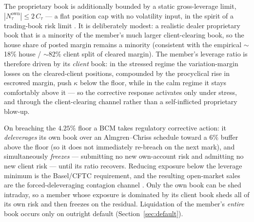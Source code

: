 The proprietary book is additionally bounded by a static gross-leverage limit,
$|N^{\mathrm{own}}_\tau| \le 2\,C_\tau$ --- a flat position cap with no volatility input, in the
spirit of a trading-book risk limit \citep{basel_frtb}. It is deliberately modest: a realistic
dealer proprietary book that is a minority of the member's much larger client-clearing book, so the
house share of posted margin remains a minority (consistent with the empirical $\sim$18\% house /
$\sim$82\% client split of cleared margin). The member's leverage ratio is therefore driven by its
\emph{client} book: in the stressed regime the variation-margin losses on the cleared-client
positions, compounded by the procyclical rise in escrowed margin, push $\kappa$ below the floor,
while in the calm regime it stays comfortably above it --- so the corrective response activates only
under stress, and through the client-clearing channel rather than a self-inflicted proprietary
blow-up.

On breaching the $4.25\%$ floor a BCM takes regulatory corrective action: it \emph{deleverages} its
own book over an Almgren--Chriss schedule \citep{almgren_chriss_2000} toward a $6\%$ buffer above
the floor (so it does not immediately re-breach on the next mark), and simultaneously
\emph{freezes} --- submitting no new own-account risk and admitting no new client risk --- until
its ratio recovers. Reducing exposure below the leverage minimum is the Basel/CFTC requirement, and
the resulting open-market sales are the forced-deleveraging contagion channel
\citep{thurner_2012,aymanns_farmer_2015}. Only the own book can be shed intraday, so a member whose
exposure is dominated by its client book sheds all of its own risk and then freezes on the
residual. Liquidation of the member's \emph{entire} book occurs only on outright default
(Section~\ref{sec:default}).

